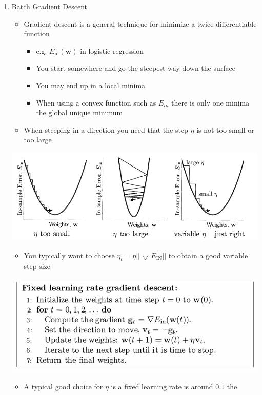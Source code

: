 \documentclass[11pt]{article}
\begin{document}
\begin{enumerate}
\item Batch Gradient Descent
\label{sec:orgc066748}
\begin{itemize}
\item Gradient descent is a general technique for minimize a twice differentiable function
\begin{itemize}
\item e.g. \(E_\text{in}(\pmb w)\) in logistic regression
\item You start somewhere and go the steepest way down the surface
\item You may end up in a local minima
\item When using a convex function such as \(E_{in}\) there is only one minima the global unique minimum
\end{itemize}

\item When steeping in a direction you need that the step \(\eta\) is not too small or too large
\end{itemize}
\begin{center}
\includegraphics[width=.9\linewidth]{The Linear Model/screenshot_2018-09-03_17-19-24.png}
\end{center}
\begin{itemize}
\item You typically want to choose \(\eta_t = \eta || \bigtriangledown E_\text{IN} ||\) to obtain a good variable step size
\end{itemize}

\begin{center}
\includegraphics[width=.9\linewidth]{The Linear Model/screenshot_2018-09-03_17-24-49.png}
\end{center}
\begin{itemize}
\item A typical good choice for \(\eta\) is a fixed learning rate is around \(0.1\) the
\end{itemize}


\end{enumerate}
\end{document}
